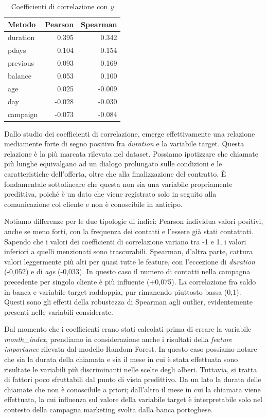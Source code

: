 \documentclass[11,5pt, a4paper]{article}
\begin{document}
\begin{table}[H]
    \centering
    \begin{tabular}{|l|r|r|}
    \hline
    Metodo    & Pearson & Spearman\\
    \hline
    duration  & 0.395 & 0.342\\
    \hline
    pdays     & 0.104 & 0.154\\
    \hline
    previous  & 0.093 & 0.169\\
    \hline
    balance   & 0.053 & 0.100\\
    \hline
    age       & 0.025 & -0.009\\
    \hline
    day       & -0.028 & -0.030\\
    \hline
    campaign  & -0.073 & -0.084\\
         \hline
    \end{tabular}
    \caption{Coefficienti di correlazione con \textit{y}}
    \label{tab:correlation-table}
\end{table}

Dallo studio dei coefficienti di correlazione, emerge effettivamente una relazione mediamente forte di segno positivo fra \textit{duration} e la variabile target. Questa relazione è la più marcata rilevata nel dataset. Possiamo ipotizzare che chiamate più lunghe equivalgano ad un dialogo prolungato sulle condizioni e le caratteristiche dell’offerta, oltre che alla finalizzazione del contratto.
È fondamentale sottolineare che questa non sia una variabile propriamente predittiva, poiché è un dato che viene registrato solo in seguito alla comunicazione col cliente e non è conoscibile in anticipo. 

Notiamo differenze per le due tipologie di indici: Pearson individua valori positivi, anche se meno forti, con la frequenza dei contatti e l’essere già stati contattati.
Sapendo che i valori dei coefficienti di correlazione variano tra -1 e 1, i valori inferiori a quelli menzionati sono trascurabili.
Spearman, d’altra parte, cattura valori leggermente più alti per quasi tutte le feature, con l’eccezione di \textit{duration} (-0,052) e di \textit{age} (-0,033).
In questo caso il numero di contatti nella campagna precedente per singolo cliente è più influente (+0,075).
La correlazione fra saldo in banca e variabile target raddoppia, pur rimanendo piuttosto bassa (0,1).
Questi sono gli effetti della robustezza di Spearman agli outlier, evidentemente presenti nelle variabili considerate.

Dal momento che i coefficienti erano stati calcolati prima di creare la variabile \textit{month\_index}, prendiamo in considerazione anche i risultati della \textit{feature importance} rilevata dal modello Random Forest.
 In questo caso possiamo notare che sia la durata della chiamata e sia il mese in cui è stata effettuata sono risultate le variabili più discriminanti nelle scelte degli alberi. 
Tuttavia, si tratta di fattori poco sfruttabili dal punto di vista predittivo. Da un lato la durata delle chiamate che non è conoscibile a priori; dall'altro il mese in cui la chiamata viene effettuata, la cui influenza sul valore della variabile target è interpretabile solo nel contesto della campagna marketing svolta dalla banca portoghese.
\end{document}
